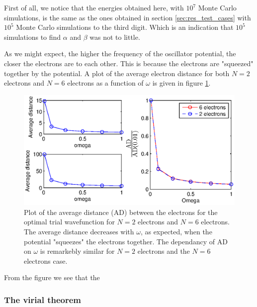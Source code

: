 First of all, we notice that the energies obtained here, with $10^7$ Monte Carlo simulations, is the same as the ones obtained in section \ref{sec:res_test_cases} with $10^5$ Monte Carlo simulations to the third digit.
Which is an indication that $10^5$ simulations to find $\alpha$ and $\beta$ was not to little. 

As we might expect, the higher the frequency of the oscillator potential, the closer the electrons are to each other.
This is because the electrons are "squeezed" together by the potential.  
A plot of the average electron distance for both $N=2$ electrons and $N=6$ electrons as a function of $\omega$ is given in figure \ref{fig:AD_electrons}.

\begin{figure}[h!]
	\centering 
	\includegraphics[width=\textwidth]{results/AD.eps}
	\caption{Plot of the average distance (AD) between the electrons for the optimal trial wavefunction for $N=2$ electrons and $N=6$ electrons. 
			The average distance decreases with $\omega$, as expected, when the potential "squeezes" the electrons together.
			The dependancy of AD on $\omega$ is remarkebly similar for $N=2$ electrons and the $N=6$ electrons case.}
	\label{fig:AD_electrons}
\end{figure}

From the figure we see that the 









\subsubsection{The virial theorem }